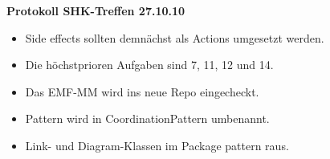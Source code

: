 \documentclass[11pt,a4paper]{article}
\begin{document}
\begin{center}

\textbf{\huge Protokoll SHK-Treffen 27.10.10}\\[1.2cm]

\end{center}

\begin{itemize}
\item Side effects sollten demnächst als Actions umgesetzt werden.
\item Die höchstprioren Aufgaben sind 7, 11, 12 und 14.
\item Das EMF-MM wird ins neue Repo eingecheckt.
\item Pattern wird in CoordinationPattern umbenannt.
\item Link- und Diagram-Klassen im Package pattern raus.
\end{itemize}
\end{document}
